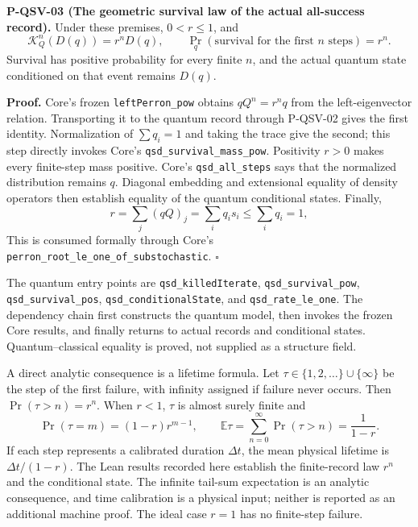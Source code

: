 \documentclass[
  11pt,
  oneside]{book}
\begin{document}
\label{p-qsv-03}{}

\textbf{P-QSV-03 (The geometric survival law of the actual all-success
record).} Under these premises, \(0<r\le1\), and \[
\mathcal K_Q^n(D(q))=r^nD(q),\qquad
\Pr_q(\text{survival for the first }n\text{ steps})=r^n.
\] Survival has positive probability for every finite \(n\), and the
actual quantum state conditioned on that event remains \(D(q)\).

\textbf{Proof.} Core's frozen \texttt{left\allowbreak Perron\_\allowbreak pow} obtains
\(qQ^n=r^nq\) from the left-eigenvector relation. Transporting it to the
quantum record through P-QSV-02 gives the first identity. Normalization
of \(\sum q_i=1\) and taking the trace give the second; this step
directly invokes Core's \texttt{qsd\_\allowbreak survival\_\allowbreak mass\_\allowbreak pow}. Positivity
\(r>0\) makes every finite-step mass positive. Core's
\texttt{qsd\_\allowbreak all\_\allowbreak steps} says that the normalized distribution remains
\(q\). Diagonal embedding and extensional equality of density operators
then establish equality of the quantum conditional states. Finally, \[
r=\sum_j(qQ)_j=\sum_iq_is_i\le\sum_iq_i=1,
\] This is consumed formally through Core's
\texttt{perron\_\allowbreak root\_\allowbreak le\_\allowbreak one\_\allowbreak of\_\allowbreak substochastic}. \(\square\)

The quantum entry points are \texttt{qsd\_\allowbreak killed\allowbreak Iterate},
\texttt{qsd\_\allowbreak survival\_\allowbreak pow}, \texttt{qsd\_\allowbreak survival\_\allowbreak pos},
\texttt{qsd\_\allowbreak conditional\allowbreak State}, and \texttt{qsd\_\allowbreak rate\_\allowbreak le\_\allowbreak one}. The
dependency chain first constructs the quantum model, then invokes the
frozen Core results, and finally returns to actual records and
conditional states. Quantum--classical equality is proved, not supplied
as a structure field.

A direct analytic consequence is a lifetime formula. Let
\(\tau\in\{1,2,\ldots\}\cup\{\infty\}\) be the step of the first
failure, with infinity assigned if failure never occurs. Then
\(\Pr(\tau>n)=r^n\). When \(r<1\), \(\tau\) is almost surely finite and
\[
\Pr(\tau=m)=(1-r)r^{m-1},\qquad
\mathbb E\tau=\sum_{n=0}^{\infty}\Pr(\tau>n)=\frac1{1-r}.
\] If each step represents a calibrated duration \(\Delta t\), the mean
physical lifetime is \(\Delta t/(1-r)\). The Lean results recorded here
establish the finite-record law \(r^n\) and the conditional state. The
infinite tail-sum expectation is an analytic consequence, and time
calibration is a physical input; neither is reported as an additional
machine proof. The ideal case \(r=1\) has no finite-step failure.
\end{document}
